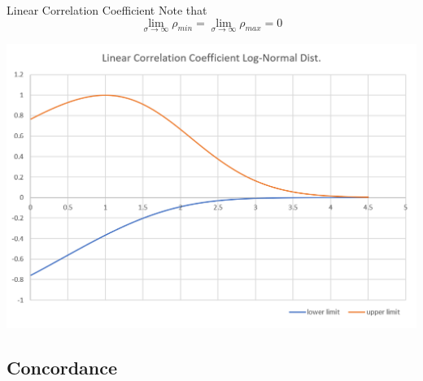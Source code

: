 \documentclass[11pt]{beamer}
\theoremstyle{plain}
\theoremstyle{definition}
\theoremstyle{remark}
\begin{document}
%
\begin{frame}{Linear Correlation Coefficient}
Note that
$$
\lim\limits_{\sigma \rightarrow \infty} \rho_{min} =\lim\limits_{\sigma \rightarrow \infty} \rho_{max}=0  
$$
\begin{center}
\includegraphics[scale=0.5]{fig/linear_correlation_lognormal.png} 
\end{center}
\end{frame}
%
\subsection{Concordance}
\end{document}
